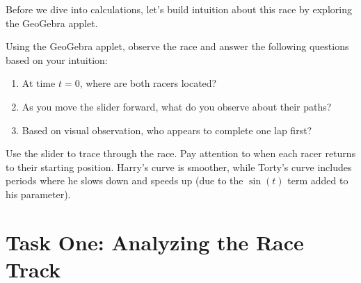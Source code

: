 \documentclass{ximera}
\begin{document}
Before we dive into calculations, let's build intuition about this race by exploring the GeoGebra applet.

\begin{problem}
    Using the GeoGebra applet, observe the race and answer the following questions based on your intuition:
    
    \begin{enumerate}
        \item At time $t=0$, where are both racers located?
        \begin{multipleChoice}
        \end{multipleChoice}
        
        \item As you move the slider forward, what do you observe about their paths?
        \begin{selectAll}
        \end{selectAll}
        
        \item Based on visual observation, who appears to complete one lap first?
        \begin{multipleChoice}
        \end{multipleChoice}
    \end{enumerate}
    
    \begin{feedback}
        Use the slider to trace through the race. Pay attention to when each racer returns to their starting position. Harry's curve is smoother, while Torty's curve includes periods where he slows down and speeds up (due to the $\sin(t)$ term added to his parameter).
    \end{feedback}
\end{problem}

\section*{Task One: Analyzing the Race Track}
\end{document}
